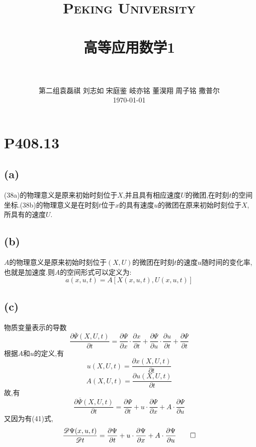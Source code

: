 \documentclass[12pt]{article}
\title{
		\vspace{-1in} 	
		\usefont{OT1}{bch}{b}{n}
		\normalfont \normalsize \textsc{\LARGE Peking University}\\[1cm] %
		\horrule{0.5pt} \\[0.5cm]
		\huge \bfseries{高等应用数学1} \\
		\horrule{2pt} \\[0.5cm]
}
\author{
		\normalfont 								\normalsize
		第二组\quad 袁磊祺 \quad 刘志如 \quad 宋庭鉴 \quad 岐亦铭 \quad 董淏翔 \quad 周子铭 \quad 撒普尔\\	\normalsize
        \today
}
\date{}
\begin{document}
% 

\maketitle

\section{P408.13}



\subsection{(a)}

(38a)的物理意义是原来初始时刻位于$X$,并且具有相应速度$U$的微团,在时刻$t$的空间坐标.(38b)的物理意义是在时刻$t$位于$x$的具有速度$u$的微团在原来初始时刻位于$X$,所具有的速度$U$.

\subsection{(b)}

$A$的物理意义是原来初始时刻位于$(X,U)$的微团在时刻$t$的速度$u$随时间的变化率,也就是加速度.则$A$的空间形式可以定义为:
\begin{equation}
	a(x,u,t)=A[X(x,u,t), U(x,u,t)]
\end{equation}

\subsection{(c)}
物质变量表示的导数
\begin{equation}
	\frac{\partial\overline\Psi(X,U,t)}{\partial t} = \frac{\partial\Psi}{\partial x}\cdot\frac{\partial x}{\partial t} + \frac{\partial\Psi}{\partial u}\cdot\frac{\partial u}{\partial t} + \frac{\partial\Psi}{\partial t}
\end{equation}
根据$A$和$u$的定义,有
\begin{equation}
	u(X,U,t) = \frac{\partial x(X,U,t)}{\partial t}
\end{equation}
\begin{equation}
	A(X,U,t) = \frac{\partial u(X,U,t)}{\partial t}
\end{equation}
故,有
\begin{equation}
	\frac{\partial\overline\Psi(X,U,t)}{\partial t} =
\frac{\partial\Psi}{\partial t} + u\cdot\frac{\partial\Psi}{\partial x} + A\cdot\frac{\partial\Psi}{\partial u}
\end{equation}
又因为有(41)式,
\begin{equation}
	\frac{\mathscr{D}\Psi(x,u,t)}{\mathscr{D} t} =
\frac{\partial\Psi}{\partial t} + u\cdot\frac{\partial\Psi}{\partial x} + A\cdot\frac{\partial\Psi}{\partial u}\qed
\end{equation}
\end{document}
